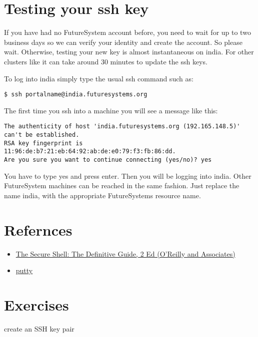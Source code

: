 \section{Testing your ssh key}\label{testing-your-ssh-key}

If you have had no FutureSystem account before, you need to wait for up
to two business days so we can verify your identity and create the
account. So please wait. Otherwise, testing your new key is almost
instantaneous on india. For other clusters like it can take around 30
minutes to update the ssh keys.

To log into india simply type the usual ssh command such as:

\begin{verbatim}
$ ssh portalname@india.futuresystems.org
\end{verbatim}

The first time you ssh into a machine you will see a message like this:

\begin{verbatim}
The authenticity of host 'india.futuresystems.org (192.165.148.5)' can't be established.
RSA key fingerprint is 11:96:de:b7:21:eb:64:92:ab:de:e0:79:f3:fb:86:dd.
Are you sure you want to continue connecting (yes/no)? yes 
\end{verbatim}

You have to type yes and press enter. Then you will be logging into
india. Other FutureSystem machines can be reached in the same fashion.
Just replace the name india, with the appropriate FutureSystems resource
name.

\section{Refernces}

\begin{itemize}
\item \href{http://shop.oreilly.com/product/9780596008956.do}{The
    Secure Shell: The Definitive Guide, 2 Ed (O'Reilly and
    Associates)}
\item \href{https://www.chiark.greenend.org.uk/~sgtatham/putty/}{putty}
\end{itemize}

\section{Exercises}

\begin{exercise}
\label{E:SSH.1} create an SSH key pair
\end{exercise}

